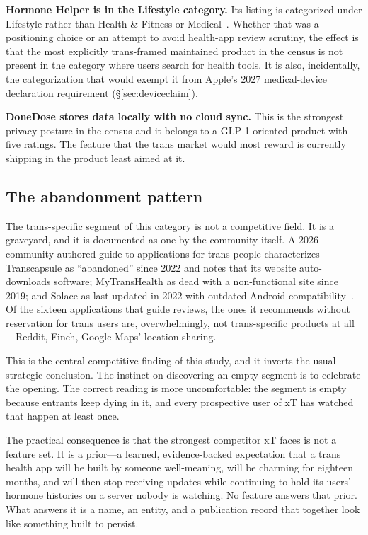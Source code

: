\documentclass[11pt,a4paper]{article}
\begin{document}
\textbf{Hormone Helper is in the Lifestyle category.} Its listing is
categorized under Lifestyle rather than Health \& Fitness or
Medical~\cite{hormonehelper}. Whether that was a positioning choice or
an attempt to avoid health-app review scrutiny, the effect is that the
most explicitly trans-framed maintained product in the census is not
present in the category where users search for health tools. It is also,
incidentally, the categorization that would exempt it from Apple's 2027
medical-device declaration requirement (\S\ref{sec:deviceclaim}).

\textbf{DoneDose stores data locally with no cloud sync.} This is the
strongest privacy posture in the census and it belongs to a
GLP-1-oriented product with five ratings. The feature that the
trans market would most reward is currently shipping in the product
least aimed at it.

\subsection{The abandonment pattern}
\label{sec:graveyard}

The trans-specific segment of this category is not a competitive field.
It is a graveyard, and it is documented as one by the community itself.
A 2026 community-authored guide to applications for trans people
characterizes Transcapsule as ``abandoned'' since 2022 and notes that
its website auto-downloads software; MyTransHealth as dead with a
non-functional site since 2019; and Solace as last updated in 2022 with
outdated Android compatibility~\cite{transsolidarity}. Of the sixteen
applications that guide reviews, the ones it recommends without
reservation for trans users are, overwhelmingly, not trans-specific
products at all---Reddit, Finch, Google Maps' location sharing.

This is the central competitive finding of this study, and it inverts
the usual strategic conclusion. The instinct on discovering an empty
segment is to celebrate the opening. The correct reading is more
uncomfortable: the segment is empty because entrants keep dying in it,
and every prospective user of xT has watched that happen at least once.

The practical consequence is that the strongest competitor xT faces is
not a feature set. It is a prior---a learned, evidence-backed
expectation that a trans health app will be built by someone
well-meaning, will be charming for eighteen months, and will then stop
receiving updates while continuing to hold its users' hormone histories
on a server nobody is watching. No feature answers that prior. What
answers it is a name, an entity, and a publication record that together
look like something built to persist.
\end{document}
